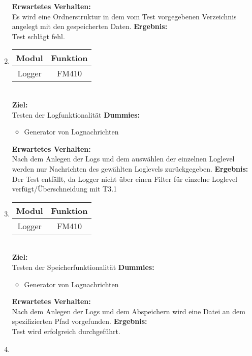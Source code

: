 \begin{enumerate}[align=left, leftmargin=4em, label={\textbf{\textbackslash T2.\arabic*\textbackslash}} ]
\begin{itemize}
		\end{itemize}
		\subitem \textbf{Erwartetes Verhalten:}\\
		Es wird eine Ordnerstruktur in dem vom Test vorgegebenen Verzeichnis angelegt mit den gespeicherten Daten.
		\subitem \textbf{Ergebnis:}\\
		Test schlägt fehl.
		\\\item \begin{tabular}{|c|c|}
			\hline Modul & Funktion \\
			\hline Logger & FM410 \\
			\hline
		\end{tabular}\\
		\subitem \textbf{Ziel:} \\ Testen der Logfunktionalität
		\subitem \textbf{Dummies:} \begin{itemize}
			\item Generator von Lognachrichten
		\end{itemize}
		\subitem \textbf{Erwartetes Verhalten:}\\
		Nach dem Anlegen der Logs und dem auswählen der einzelnen Loglevel werden nur Nachrichten des gewählten Loglevels zurückgegeben.
		\subitem \textbf{Ergebnis:}\\
		Der Test entfällt, da Logger nicht über einen Filter für einzelne Loglevel verfügt/Überschneidung mit T3.1
		\\\item \begin{tabular}{|c|c|}
			\hline Modul & Funktion \\
			\hline Logger & FM410 \\
			\hline
		\end{tabular}\\
		\subitem \textbf{Ziel:} \\ Testen der Speicherfunktionalität
		\subitem \textbf{Dummies:} \begin{itemize}
			\item Generator von Lognachrichten
		\end{itemize}
		\subitem \textbf{Erwartetes Verhalten:}\\
		Nach dem Anlegen der Logs und dem Abspeichern wird eine Datei an dem spezifizierten Pfad vorgefunden.
		\subitem \textbf{Ergebnis:}\\
		Test wird erfolgreich durchgeführt.
		\\\item \begin{tabular}{|c|c|}

\end{tabular}
\end{enumerate}
